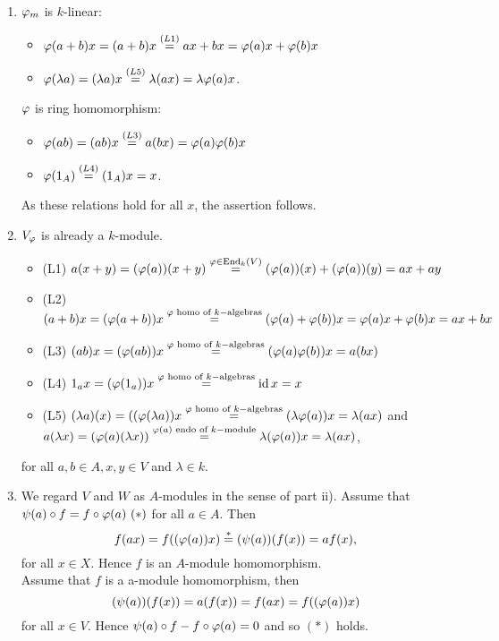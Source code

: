 \begin{sol}
  \begin{enumerate}
    \item $\varphi_m$ is $k$-linear:
    \begin{itemize}
      \item $\varphi(a+b)x=(a+b)x\overset{(L1)}{=}ax+bx=\varphi(a)x+\varphi(b)x$
      \item $\varphi(\lambda a)=(\lambda a)x\overset{(L5)}{=}\lambda(ax)=\lambda\varphi(a)x$.
    \end{itemize}
    $\varphi$ is ring homomorphism:
    \begin{itemize}
      \item $\varphi(ab)=(ab)x\overset{(L3)}{=}a(bx)=\varphi(a)\varphi(b)x$
      \item $\varphi(1_A)\overset{(L4)}{=}(1_A)x=x$.
    \end{itemize}
    As these relations hold for all $x$, the assertion follows.
    \item $V_{\varphi}$ is already a $k$-module.
    \begin{itemize}
      \item (L1) $a(x+y)=(\varphi(a))(x+y)\overset{\varphi \in \operatorname{End}_k(V)}{=}(\varphi(a))(x)+(\varphi(a))(y) = ax+ay$
      \item (L2) $(a+b)x=(\varphi(a+b))x\overset{\varphi\text{ homo of } k-\text{algebras}}{=}(\varphi(a)+\varphi(b))x=\varphi(a)x+\varphi(b)x=ax+bx$
      \item (L3) $(ab)x=(\varphi(ab))x\overset{\varphi\text{ homo of } k-\text{algebras}}{=}(\varphi(a)\varphi(b))x=a(bx)$
      \item (L4) $1_ax=(\varphi(1_a))x\overset{\varphi\text{ homo of } k-\text{algebras}}{=}\operatorname{id} x=x$
      \item (L5) $(\lambda a)(x)=((\varphi(\lambda a))x\overset{\varphi\text{ homo of } k-\text{algebras}}{=} (\lambda\varphi(a))x=\lambda(ax)$ and \\$a(\lambda x)=(\varphi(a)(\lambda x))\overset{\varphi(a)\text{ endo of } k-\text{module}}{=}\lambda (\varphi(a))x=\lambda (ax)$,
    \end{itemize}
    for all $a,b\in A,x,y\in V$ and $\lambda \in k$.
    \item We regard $V$ and $W$ as $A$-modules in the sense of part ii). Assume that $\psi(a)\circ f=f\circ \varphi(a)~(\ast)$ for all $a\in A$. Then
    \[
    f(ax)=f((\varphi(a))x)\overset{\ast}{=}(\psi(a))(f(x))=af(x),
    \]
    for all $x\in X$.
    Hence $f$ is an $A$-module homomorphism.\\
    Assume that $f$ is a a-module homomorphism, then
    \[
    (\psi(a))(f(x))=a(f(x))=f(ax)=f((\varphi(a))x)\]
    for all $x\in V$. Hence $\psi(a)\circ f - f\circ \varphi(a)=0$ and so $(\ast)$ holds.
  \end{enumerate}
\end{sol}

